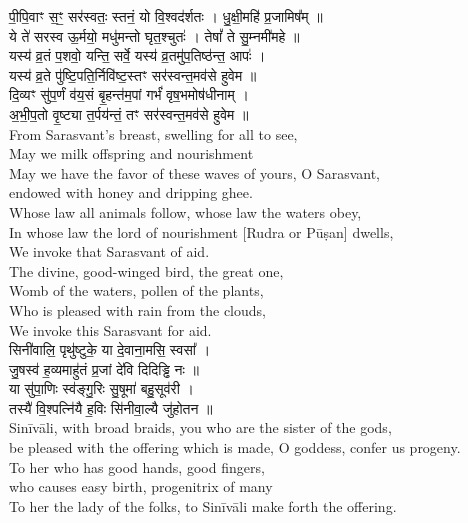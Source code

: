 \documentclass[11pt]{article}
\begin{document}
\begin{adjustwidth}{6em}{.2em}
{\large\skts\color{deepblue}
पी॒पि॒वाꣳ स॒ꣳ॒ सर॑स्वतः॒ स्तनं॒ यो वि॒श्वद॑र्शतः । धु॒क्षी॒महि॑ प्र॒जामिष᳚म् ॥\\
ये ते॑ सरस्व ऊ॒र्मयो॒ मधु॑मन्तो घृत॒श्चुतः॑ । तेषां᳚ ते सु॒म्नमी॑महे ॥\\ 
यस्य॑ व्र॒तं प॒शवो॒ यन्ति॒ सर्वे॒ यस्य॑ व्र॒तमु॑प॒तिष्ठ॑न्त॒ आपः॑ ।\\ 
यस्य॑ व्र॒ते पु॑ष्टि॒पति॒र्निवि॑ष्ट॒स्तꣳ सर॑स्वन्त॒मव॑से हुवेम ॥\\
दि॒व्यꣳ सु॑प॒र्णं व॑य॒सं बृ॒हन्त॑म॒पां गर्भं॑ वृष॒भमोष॑धीनाम् ।\\
अ॒भी॒प॒तो वृ॒ष्ट्या त॒र्पय॑न्तं॒ तꣳ सर॑स्वन्त॒मव॑से हुवेम ॥}\\[5pt] 
From Sarasvant's breast, swelling for all to see,\\
May we milk offspring and nourishment\\
May we have the favor of these waves of yours, O Sarasvant,\\ 
endowed with honey and dripping ghee.\\
Whose law all animals follow, whose law the waters obey,\\
In whose law the lord of nourishment [Rudra or Pūṣan] dwells,\\
We invoke that Sarasvant of aid.\\
The divine, good-winged bird, the great one,\\
Womb of the waters, pollen of the plants,\\
Who is pleased with rain from the clouds,\\
We invoke this Sarasvant for aid.\\[10pt]

{\large\skts\color{deepblue}
सिनी॑वालि॒ पृथु॑ष्टुके॒ या दे॒वाना॒मसि॒ स्वसा᳚ ।\\
जु॒षस्व॑ ह॒व्यमाहु॑तं प्र॒जां दे॑वि दिदिड्ढि नः ॥\\
या सु॑पा॒णिः स्व॑ङ्गु॒रिः सु॒षूमा॑ बहु॒सूव॑री ।\\
तस्यै॑ वि॒श्पत्नि॑यै ह॒विः सि॑नीवा॒ल्यै जु॑होतन ॥}\\[5pt]
Sinīvāli, with broad braids, you who are the sister of the gods,\\
be pleased with the offering which is made, O goddess, confer us progeny.\\
To her who has good hands, good fingers,\\ 
who causes easy birth, progenitrix of many\\
To her the lady of the folks, to Sinīvāli make forth the offering.\\
\end{adjustwidth}
\end{document}
